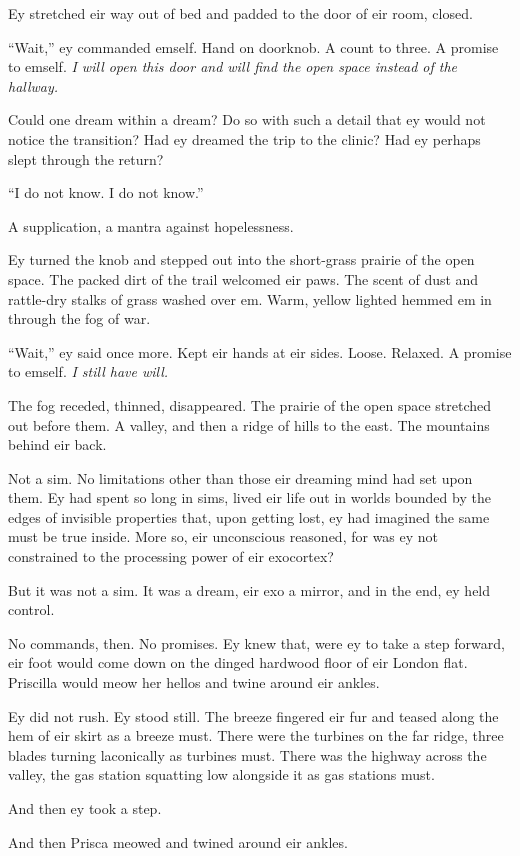 Ey stretched eir way out of bed and padded to the door of eir room, closed.

``Wait,'' ey commanded emself. Hand on doorknob. A count to three. A promise to emself. \emph{I will open this door and will find the open space instead of the hallway.}

Could one dream within a dream? Do so with such a detail that ey would not notice the transition? Had ey dreamed the trip to the clinic? Had ey perhaps slept through the return?

``I do not know. I do not know.''

A supplication, a mantra against hopelessness.

Ey turned the knob and stepped out into the short-grass prairie of the open space. The packed dirt of the trail welcomed eir paws. The scent of dust and rattle-dry stalks of grass washed over em. Warm, yellow lighted hemmed em in through the fog of war.

``Wait,'' ey said once more. Kept eir hands at eir sides. Loose. Relaxed. A promise to emself. \emph{I still have will.}

The fog receded, thinned, disappeared. The prairie of the open space stretched out before them. A valley, and then a ridge of hills to the east. The mountains behind eir back.

Not a sim. No limitations other than those eir dreaming mind had set upon them. Ey had spent so long in sims, lived eir life out in worlds bounded by the edges of invisible properties that, upon getting lost, ey had imagined the same must be true inside. More so, eir unconscious reasoned, for was ey not constrained to the processing power of eir exocortex?

But it was not a sim. It was a dream, eir exo a mirror, and in the end, ey held control.

No commands, then. No promises. Ey knew that, were ey to take a step forward, eir foot would come down on the dinged hardwood floor of eir London flat. Priscilla would meow her hellos and twine around eir ankles.

Ey did not rush. Ey stood still. The breeze fingered eir fur and teased along the hem of eir skirt as a breeze must. There were the turbines on the far ridge, three blades turning laconically as turbines must. There was the highway across the valley, the gas station squatting low alongside it as gas stations must.

And then ey took a step.

And then Prisca meowed and twined around eir ankles.

